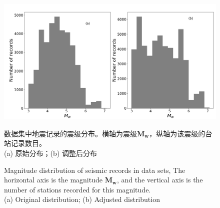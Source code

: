 \begin{figure}[!h] 
\centering 
 \includegraphics[width=0.95\linewidth]{img/event_dist.png} 
 \renewcommand{\figurename}{图} 
\caption{数据集中地震记录的震级分布。横轴为震级$\mathbf{M}_{\mathbf{w}}$，纵轴为该震级的台站记录数目。\\
(a) 原始分布；(b) 调整后分布} 
\addtocounter{figure}{-1} \vspace{-5pt} 
\renewcommand{\figurename}{Fig} 
\caption{Magnitude distribution of seismic records in data sets, The horizontal axis is the magnitude $\mathbf{M}_{\mathbf{w}}$, and the vertical axis is the number of stations recorded for this magnitude.\\
(a) Original distribution; (b) Adjusted distribution
} 
\renewcommand{\figurename}{图} 
\label{fig:network-device-influence.png} 
\end{figure}



